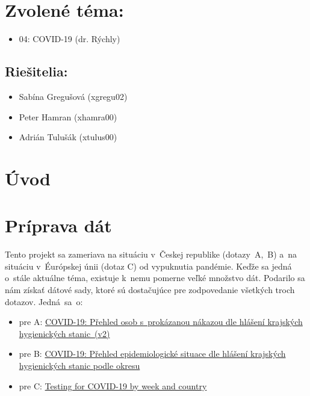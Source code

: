 \documentclass [11pt, a4paper]{article}
\begin{document}
\section*{Zvolené téma:} 
\begin{itemize}[noitemsep]
\item 04: COVID-19 (dr. Rýchly)
\end{itemize}


\subsection*{Riešitelia:}
\begin{itemize}[noitemsep]
\item Sabína Gregušová (xgregu02)
\item Peter Hamran (xhamra00)
\item Adrián Tulušák (xtulus00)
\end{itemize}

\section{Úvod}

\section{Príprava dát}

Tento projekt sa zameriava na situáciu v~Českej republike (dotazy~A,~B) a~na situáciu v~Éurópskej únii (dotaz C) od vypuknutia pandémie. Keďže sa jedná o~stále aktuálne téma, existuje k~nemu pomerne veľké množstvo dát. Podarilo sa nám získať dátové sady, ktoré sú dostačujúce pre zodpovedanie všetkých troch dotazov. Jedná~sa~o:

\begin{itemize}
\item pre A: \href{https://onemocneni-aktualne.mzcr.cz/api/v2/covid-19/osoby.min.json }{COVID-19: Přehled osob s~prokázanou nákazou dle hlášení krajských hygienických stanic~(v2)}
\item pre B: \href{https://onemocneni-aktualne.mzcr.cz/api/v2/covid-19/kraj-okres-nakazeni-vyleceni-umrti.min.json}{COVID-19: Přehled epidemiologické situace dle hlášení krajských hygienických stanic podle okresu}
\item pre C: \href{https://www.ecdc.europa.eu/en/publications-data/covid-19-testing}{Testing for COVID-19 by week and country}
\end{itemize}
\end{document}
